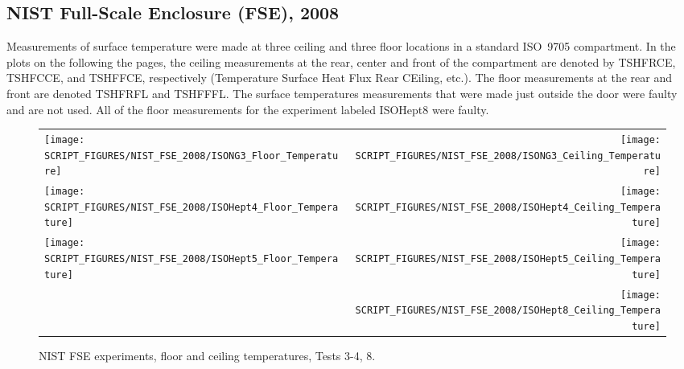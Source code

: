 \clearpage

\subsection{NIST Full-Scale Enclosure (FSE), 2008}

Measurements of surface temperature were made at three ceiling and three floor locations in a standard ISO~9705 compartment. In the plots on the following the pages, the ceiling measurements at the rear, center and front of the compartment are denoted by TSHFRCE, TSHFCCE, and TSHFFCE, respectively (Temperature Surface Heat Flux Rear CEiling, etc.). The floor measurements at the rear and front are denoted TSHFRFL and TSHFFFL. The surface temperatures measurements that were made just outside the door were faulty and are not used. All of the floor measurements for the experiment labeled ISOHept8 were faulty.

\newpage

\begin{figure}[p]
\begin{tabular*}{\textwidth}{l@{\extracolsep{\fill}}r}
\texttt{[image: SCRIPT\_FIGURES/NIST\_FSE\_2008/ISONG3\_Floor\_Temperature]} &
\texttt{[image: SCRIPT\_FIGURES/NIST\_FSE\_2008/ISONG3\_Ceiling\_Temperature]} \\
\texttt{[image: SCRIPT\_FIGURES/NIST\_FSE\_2008/ISOHept4\_Floor\_Temperature]} &
\texttt{[image: SCRIPT\_FIGURES/NIST\_FSE\_2008/ISOHept4\_Ceiling\_Temperature]} \\
\texttt{[image: SCRIPT\_FIGURES/NIST\_FSE\_2008/ISOHept5\_Floor\_Temperature]} &
\texttt{[image: SCRIPT\_FIGURES/NIST\_FSE\_2008/ISOHept5\_Ceiling\_Temperature]} \\
 &
\texttt{[image: SCRIPT\_FIGURES/NIST\_FSE\_2008/ISOHept8\_Ceiling\_Temperature]}
\end{tabular*}
\caption[NIST FSE experiments, floor and ceiling temperatures, Tests 3-4, 8]{NIST FSE experiments, floor and ceiling temperatures, Tests 3-4, 8.}
\label{NIST_FSE_2008_Surface_Temp_1}
\end{figure}


